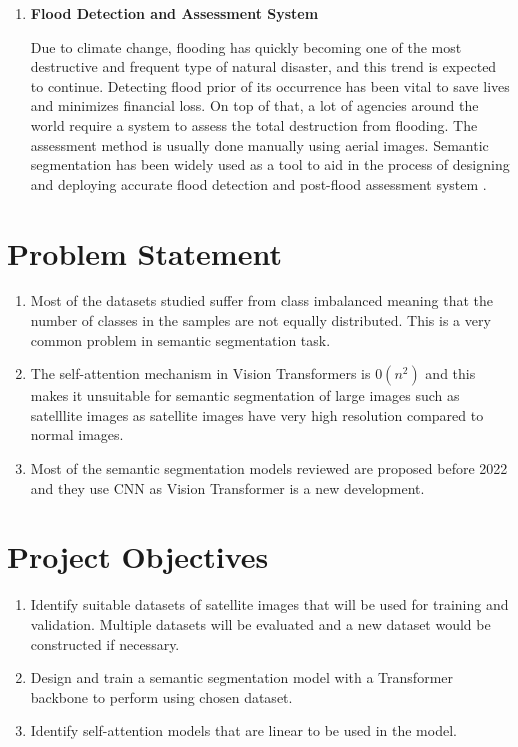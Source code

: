 \begin{enumerate}
    \item \textbf{Flood Detection and Assessment System}
    
    Due to climate change, flooding has quickly becoming one of the most destructive and frequent type of natural disaster, and this trend is expected to continue. Detecting flood prior of its occurrence has been vital to save lives and minimizes financial loss. On top of that, a lot of agencies around the world require a system to assess the total  destruction from flooding. The assessment method is usually done manually using aerial images. Semantic segmentation has been widely used as a tool to aid in the process of designing and deploying accurate flood detection and post-flood assessment system \cite{edseee.988427220220717}. 
\end{enumerate}

\section{Problem Statement}

\begin{enumerate}
    \item Most of the datasets studied suffer from class imbalanced meaning that the number of classes in the samples are not equally distributed. This is a very common problem in semantic segmentation task.
    \item The self-attention mechanism in Vision Transformers is $0(n^2)$ and this makes it unsuitable for semantic segmentation of large images such as satelllite images as satellite images have very high resolution compared to normal images.
    \item Most of the semantic segmentation models reviewed are proposed before 2022 and they use CNN as Vision Transformer is a new development.  

\end{enumerate}


\section{Project Objectives}
\begin{enumerate}
    \item Identify suitable datasets of satellite images that will be used for training and validation. Multiple datasets will be evaluated and a new dataset would be constructed if necessary.
    \item Design and train a semantic segmentation model with a Transformer backbone to perform using chosen dataset.
    \item Identify self-attention models that are linear to be used in the model.
\end{enumerate}
